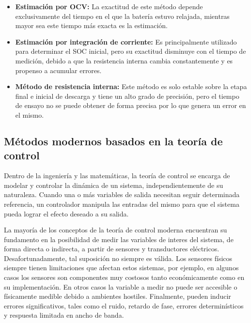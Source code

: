 \begin{itemize}
    \item \textbf{Estimaci\'on por OCV:} La exactitud de este m\'etodo depende
        exclusivamente del tiempo en el que la bater\'ia estuvo relajada,
        mientras mayor sea este tiempo m\'as exacta es la estimaci\'on.
    \item \textbf{Estimaci\'on por integraci\'on de corriente:} Es
        principalmente utilizado para determinar el \acrshort{SOC} inicial, pero
        su exactitud disminuye con el tiempo de medici\'on, debido a que la
        resistencia interna cambia constantemente y es propenso a acumular
        errores.
    \item \textbf{M\'etodo de resistencia interna:} Este m\'etodo es solo
        estable sobre la etapa final e inicial de descarga y tiene un alto grado 
        de precisi\'on, pero el tiempo de ensayo no se puede obtener de forma
        precisa por lo que genera un error en el mismo.
\end{itemize}


\subsection{M\'etodos modernos basados en la teor\'ia de control}
\label{controlTheoryMethod}

\noindent Dentro de la ingenier\'ia y las matem\'aticas, la teor\'ia de control
se encarga de modelar y controlar la din\'amica de un sistema,
independientemente de su naturaleza. Cuando una o m\'as variables de salida
necesitan seguir determinada referencia, un controlador manipula las entradas
del mismo para que el sistema pueda lograr el efecto deseado a su salida.

\noindent La mayor\'ia de los conceptos de la teoría de control moderna
encuentran su fundamento en la posibilidad de medir las variables de interes del
sistema, de forma directa o indirecta, a partir de sensores y transductores
eléctricos. Desafortunadamente, tal suposici\'on no siempre es v\'alida. Los
sensores f\'isicos siempre tienen limitaciones que afectan estos sistemas, por
ejemplo, en algunos casos los sensores son componentes muy costosos tanto
econ\'omicamente como en su implementaci\'on. En otros casos la variable a medir
no puede ser accesible o f\'isicamente medible debido a ambientes hostiles.
Finalmente, pueden inducir errores significativos, tales como el ruido,
retardo de fase, errores determin\'isticos y respuesta limitada en ancho de
banda.

